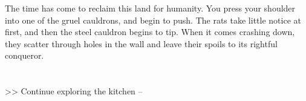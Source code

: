 The time has come to reclaim this land for humanity. You press your shoulder into one of the gruel cauldrons, and begin to push. The rats take little notice at first, and then the steel cauldron begins to tip. When it comes crashing down, they scatter through holes in the wall and leave their spoils to its rightful conqueror.\\
\\
\\

>> Continue exploring the kitchen -- 